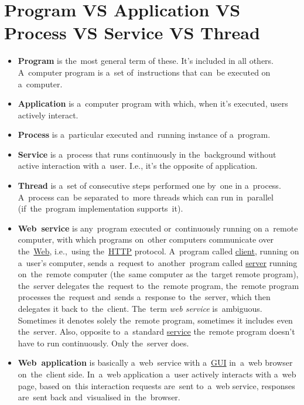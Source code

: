 \section*{\fontsize{17}{17} \selectfont Program VS Application VS Process VS Service VS Thread}
\label{applicationprocessprogramservicethread}
\begin{itemize}
    \item \textbf{Program} is the~most general term of these. It's included in all others. A~computer program is a~set of~instructions that can~be executed on a~computer.
    \item \textbf{Application} is a~computer program with which, when it's executed, users actively interact.
    \item \textbf{Process} is a~particular executed and~running instance of a~program.
    \item \textbf{Service} is a~process that runs continuously in the~background without active interaction with a~user. I.e., it's the opposite of application.
    \item \textbf{Thread} is a~set of consecutive steps performed one by~one in a~process. A~process can~be separated to~more threads which can run in~parallel (if~the~program implementation supports~it).
\end{itemize}

\label{webserviceapplication}
\begin{itemize}
    \item \textbf{Web~service} is any~program executed or~continuously running on a~remote computer, with which programs on~other computers communicate over the~\hyperref[internetweb]{Web}, i.e.,~using the~\hyperref[http]{HTTP} protocol. A~program called \hyperref[clientserverarchitecture]{client}, running on a~user's computer, sends a~request to~another~program called \hyperref[clientserverarchitecture]{server} running on~the~remote computer (the~same computer as the~target remote program), the~server delegates the~request to~the~remote program, the~remote program processes the~request and~sends a~response to~the~server, which then delegates it back to~the~client. \warningnonl The~term \textit{web service} is~ambiguous. Sometimes it denotes solely the~remote program, sometimes it includes even the~server. Also, opposite to~a~standard \hyperref[applicationprocessprogramservicethread]{service} the~remote program doesn't have to run continuously. Only the~server does.
    \item \textbf{Web~application} is basically a~web~service with a~\hyperref[shellcligui]{GUI} in~a~web browser on~the~client side. In~a~web application a~user actively interacts with a~web page, based on~this interaction requests are~sent to~a~web service, responses are~sent back and~visualised in~the~browser.
\end{itemize}

